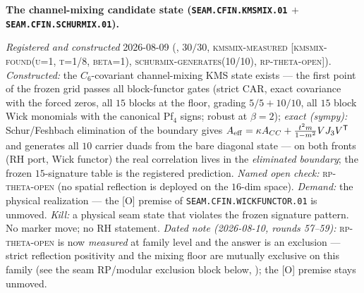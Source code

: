 \par\smallskip\noindent\textbf{The channel-mixing candidate
state (\texttt{SEAM.CFIN.\allowbreak KMSMIX.01} $+$
\texttt{SEAM.CFIN.\allowbreak SCHURMIX.01}).}
{\sloppy
\emph{Registered and constructed} 2026-08-09
(, $30/30$,
\textsc{kmsmix-measured [kmsmix-found(u=1, t=1/8, beta=1),
schurmix-generates(10/10), rp-theta-open]}).  \emph{Constructed:}
the $C_6$-covariant channel-mixing KMS state exists --- the
first point of the frozen grid passes all block-functor gates
(strict CAR, exact covariance with the forced zeros, all $15$
blocks at the floor, grading $5/5 + 10/10$, all $15$ block Wick
monomials with the canonical Pf$_4$ signs; robust at $\beta =
2$); \emph{exact (sympy):} Schur/Feshbach elimination of the
boundary gives $A_{\rm eff} = \kappa A_{CC} +
\tfrac{t^2 m}{1 - m^2} V J_3 V^{\mathsf T}$ and generates all
$10$ carrier duads from the bare diagonal state --- on both
fronts (RH port, Wick functor) the real correlation lives in
the \emph{eliminated boundary}; the frozen $15$-signature table
is the registered prediction.  \emph{Named open check:}
\textsc{rp-theta-open} (no spatial reflection is deployed on the
$16$-dim space).  \emph{Demand:} the physical realization ---
the [O] premise of \texttt{SEAM.CFIN.WICKFUNCTOR.01} is
unmoved.  \emph{Kill:} a physical seam state that violates the
frozen signature pattern.  No marker move; no RH statement.
\emph{Dated note (2026-08-10, rounds 57--59):}
\textsc{rp-theta-open} is now \emph{measured} at family level and
the answer is an exclusion --- strict reflection positivity and
the mixing floor are mutually exclusive on this family (see the
seam RP/modular exclusion block below,
); the [O] premise stays
unmoved.\par}


